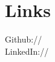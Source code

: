 \documentclass[]{deedy-resume-openfont}
\begin{document}
\begin{minipage}[t]{0.33\textwidth}

\section{Links}
Github:// \href{https://github.com/wodeni}{} \\
LinkedIn://  \href{https://www.linkedin.com/in/wode-ni}{} \\



%
%

\end{minipage}
\hfill
\end{document}
